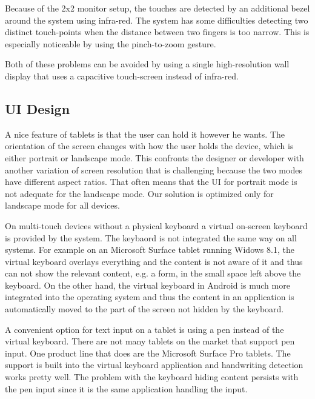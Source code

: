 \documentclass{sigchi}
\begin{document}
Because of the 2x2 monitor setup, the touches are detected by an additional bezel around the system using infra-red.
The system has some difficulties detecting two distinct touch-points when the distance between two fingers is too narrow.
This is especially noticeable by using the pinch-to-zoom gesture.

Both of these problems can be avoided by using a single high-resolution wall display that uses a capacitive touch-screen instead of infra-red.

\subsection{UI Design}
A nice feature of tablets is that the user can hold it however he wants.
The orientation of the screen changes with how the user holds the device, which is either portrait or landscape mode.
This confronts the designer or developer with another variation of screen resolution that is challenging because the two modes have different aspect ratios.
That often means that the UI for portrait mode is not adequate for the landscape mode.
Our solution is optimized only for landscape mode for all devices.

On multi-touch devices without a physical keyboard a virtual on-screen keyboard is provided by the system.
The keybaord is not integrated the same way on all systems.
For example on an Microsoft Surface tablet running Widows 8.1, the virtual keyboard overlays everything and the content is not aware of it and thus can not show the relevant content, e.g. a form, in the small space left above the keyboard.
On the other hand, the virtual keyboard in Android is much more integrated into the operating system and thus the content in an application is automatically moved to the part of the screen not hidden by the keyboard.

A convenient option for text input on a tablet is using a pen instead of the virtual keyboard.
There are not many tablets on the market that support pen input.
One product line that does are the Microsoft Surface Pro tablets.
The support is built into the virtual keyboard application and handwriting detection works pretty well.
The problem with the keyboard hiding content persists with the pen input since it is the same application handling the input.
\end{document}
